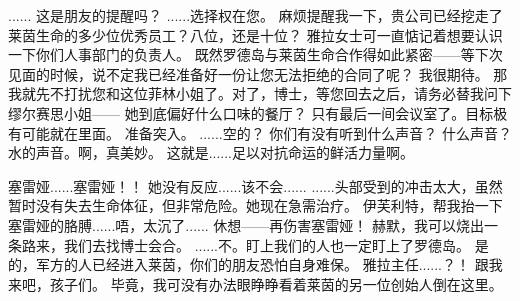 \documentclass[openany]{book}
\begin{document}
\begin{dialogue}
     ......
     这是朋友的提醒吗？
     ......选择权在您。
     麻烦提醒我一下，贵公司已经挖走了莱茵生命的多少位优秀员工？八位，还是十位？
     雅拉女士可一直惦记着想要认识一下你们人事部门的负责人。
     既然罗德岛与莱茵生命合作得如此紧密——等下次见面的时候，说不定我已经准备好一份让您无法拒绝的合同了呢？
     我很期待。
     那我就先不打扰您和这位菲林小姐了。对了，博士，等您回去之后，请务必替我问下缪尔赛思小姐——
     她到底偏好什么口味的餐厅？
     只有最后一间会议室了。目标极有可能就在里面。
     准备突入。
     ......空的？
     你们有没有听到什么声音？
     什么声音？
     水的声音。啊，真美妙。
     这就是......足以对抗命运的鲜活力量啊。
\end{dialogue}

\begin{dialogue}
     塞雷娅......塞雷娅！！
     她没有反应......该不会......
     ......头部受到的冲击太大，虽然暂时没有失去生命体征，但非常危险。她现在急需治疗。
     伊芙利特，帮我抬一下塞雷娅的胳膊......唔，太沉了......
     休想——再伤害塞雷娅！
     赫默，我可以烧出一条路来，我们去找博士会合。
     ......不。盯上我们的人也一定盯上了罗德岛。
     是的，军方的人已经进入莱茵，你们的朋友恐怕自身难保。
     雅拉主任......？！
     跟我来吧，孩子们。
     毕竟，我可没有办法眼睁睁看着莱茵的另一位创始人倒在这里。
\end{dialogue}
\end{document}

